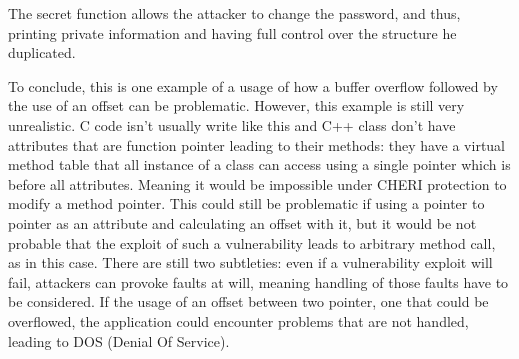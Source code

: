 \documentclass[a4paper, 11pt]{article}
\begin{document}
\begin{center}
\end{center}
The secret function allows the attacker to change the password, and thus, printing private information and having full control over the structure he duplicated.

To conclude, this is one example of a usage of how a buffer overflow followed by the use of an offset can be problematic.
However, this example is still very unrealistic. C code isn't usually write like this and C++ class don't have attributes that are function pointer leading to their methods: they have a virtual method table that all instance of a class can access using a single pointer which is before all attributes. Meaning it would be impossible under CHERI protection to modify a method pointer. This could still be problematic if using a pointer to pointer as an attribute and calculating an offset with it, but it would be not probable that the exploit of such a vulnerability leads to arbitrary method call, as in this case.
There are still two subtleties: even if a vulnerability exploit will fail, attackers can provoke faults at will, meaning handling of those faults have to be considered. If the usage of an offset between two pointer, one that could be overflowed, the application could encounter problems that are not handled, leading to DOS (Denial Of Service).
\end{document}
